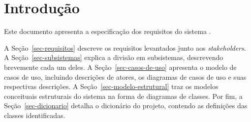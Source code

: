 \chapter{Introdução}
\label{sec-intro}

Este documento apresenta a especificação dos requisitos do sistema \emph{\imprimirtitulo}.


A Seção~\ref{sec-requisitos} descreve os requisitos levantados junto aos \textit{stakeholders}.
A Seção~\ref{sec-subsistemas} explica a divisão em subsistemas, descrevendo brevemente cada um deles. 
A Seção~\ref{sec-casos-de-uso} apresenta o modelo de casos de uso, incluindo descrições de atores, os diagramas de casos de uso e suas respectivas descrições. 
A Seção~\ref{sec-modelo-estrutural} traz os modelos conceituais estruturais do sistema na forma de diagramas de classes.  Por fim, a Seção~\ref{sec-dicionario} detalha o dicionário do projeto, contendo as definições das classes identificadas.
